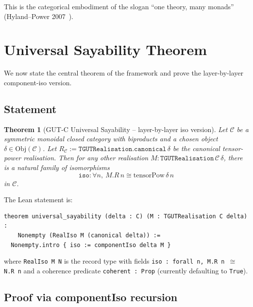 \documentclass[11pt,a4paper]{article}
\theoremstyle{plain}
\newtheorem{theorem}{Theorem}[section]
\theoremstyle{definition}
\theoremstyle{remark}
\newcommand{\Ob}{\mathrm{Obj}}
\newcommand{\tensorPow}{\mathrm{tensorPow}}
\begin{document}
This is the categorical embodiment of the slogan ``one theory, many monads'' (Hyland--Power 2007~\cite{HP07}).

\section{Universal Sayability Theorem}\label{sec:us}

We now state the central theorem of the framework and prove the layer-by-layer component-iso version.

\subsection{Statement}\label{sec:us:statement}

\begin{theorem}[GUT-C Universal Sayability -- layer-by-layer iso version]\label{thm:us}
Let $\mathcal{C}$ be a symmetric monoidal closed category with biproducts and a chosen object $\delta \in \Ob(\mathcal{C})$. Let $R_{\mathcal{C}} := \mathtt{TGUTRealisation.canonical}\,\delta$ be the canonical tensor-power realisation. Then for any other realisation $M : \mathtt{TGUTRealisation}\,\mathcal{C}\,\delta$, there is a natural family of isomorphisms
\[
\mathtt{iso} : \forall n,\ M.R\,n \cong \tensorPow\,\delta\,n
\]
in $\mathcal{C}$.
\end{theorem}

The Lean statement is:

\begin{lstlisting}[language=Lean]
theorem universal_sayability (delta : C) (M : TGUTRealisation C delta) :
    Nonempty (RealIso M (canonical delta)) :=
  Nonempty.intro { iso := componentIso delta M }
\end{lstlisting}

where \texttt{RealIso M N} is the record type with fields \texttt{iso : forall n, M.R n $\cong$ N.R n} and a coherence predicate \texttt{coherent : Prop} (currently defaulting to \texttt{True}).

\subsection{Proof via componentIso recursion}\label{sec:us:proof}
\end{document}

